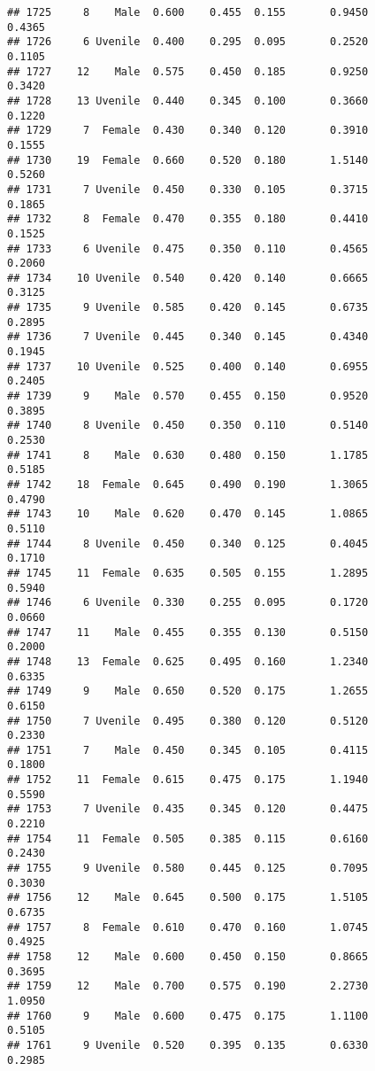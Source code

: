 \documentclass[
]{article}
\begin{document}
\begin{verbatim}
## 1725     8    Male  0.600    0.455  0.155       0.9450         0.4365
## 1726     6 Uvenile  0.400    0.295  0.095       0.2520         0.1105
## 1727    12    Male  0.575    0.450  0.185       0.9250         0.3420
## 1728    13 Uvenile  0.440    0.345  0.100       0.3660         0.1220
## 1729     7  Female  0.430    0.340  0.120       0.3910         0.1555
## 1730    19  Female  0.660    0.520  0.180       1.5140         0.5260
## 1731     7 Uvenile  0.450    0.330  0.105       0.3715         0.1865
## 1732     8  Female  0.470    0.355  0.180       0.4410         0.1525
## 1733     6 Uvenile  0.475    0.350  0.110       0.4565         0.2060
## 1734    10 Uvenile  0.540    0.420  0.140       0.6665         0.3125
## 1735     9 Uvenile  0.585    0.420  0.145       0.6735         0.2895
## 1736     7 Uvenile  0.445    0.340  0.145       0.4340         0.1945
## 1737    10 Uvenile  0.525    0.400  0.140       0.6955         0.2405
## 1739     9    Male  0.570    0.455  0.150       0.9520         0.3895
## 1740     8 Uvenile  0.450    0.350  0.110       0.5140         0.2530
## 1741     8    Male  0.630    0.480  0.150       1.1785         0.5185
## 1742    18  Female  0.645    0.490  0.190       1.3065         0.4790
## 1743    10    Male  0.620    0.470  0.145       1.0865         0.5110
## 1744     8 Uvenile  0.450    0.340  0.125       0.4045         0.1710
## 1745    11  Female  0.635    0.505  0.155       1.2895         0.5940
## 1746     6 Uvenile  0.330    0.255  0.095       0.1720         0.0660
## 1747    11    Male  0.455    0.355  0.130       0.5150         0.2000
## 1748    13  Female  0.625    0.495  0.160       1.2340         0.6335
## 1749     9    Male  0.650    0.520  0.175       1.2655         0.6150
## 1750     7 Uvenile  0.495    0.380  0.120       0.5120         0.2330
## 1751     7    Male  0.450    0.345  0.105       0.4115         0.1800
## 1752    11  Female  0.615    0.475  0.175       1.1940         0.5590
## 1753     7 Uvenile  0.435    0.345  0.120       0.4475         0.2210
## 1754    11  Female  0.505    0.385  0.115       0.6160         0.2430
## 1755     9 Uvenile  0.580    0.445  0.125       0.7095         0.3030
## 1756    12    Male  0.645    0.500  0.175       1.5105         0.6735
## 1757     8  Female  0.610    0.470  0.160       1.0745         0.4925
## 1758    12    Male  0.600    0.450  0.150       0.8665         0.3695
## 1759    12    Male  0.700    0.575  0.190       2.2730         1.0950
## 1760     9    Male  0.600    0.475  0.175       1.1100         0.5105
## 1761     9 Uvenile  0.520    0.395  0.135       0.6330         0.2985

\end{verbatim}
\end{document}
